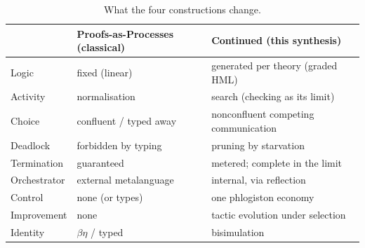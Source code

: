 \documentclass[11pt]{article}
\theoremstyle{definition}
\theoremstyle{plain}
\begin{document}
\begin{table}[h]
\centering
\small
\begin{tabular}{@{}lll@{}}
\toprule
 & \textbf{Proofs-as-Processes (classical)} & \textbf{Continued (this synthesis)} \\
\midrule
Logic        & fixed (linear)            & generated per theory (graded HML) \\
Activity     & normalisation             & search (checking as its limit) \\
Choice       & confluent / typed away    & nonconfluent competing communication \\
Deadlock     & forbidden by typing       & pruning by starvation \\
Termination  & guaranteed                & metered; complete in the limit \\
Orchestrator & external metalanguage     & internal, via reflection \\
Control      & none (or types)           & one phlogiston economy \\
Improvement  & none                      & tactic evolution under selection \\
Identity     & $\beta\eta$ / typed       & bisimulation \\
\bottomrule
\end{tabular}
\caption{What the four constructions change.}
\label{tab:scale}
\end{table}
\end{document}

